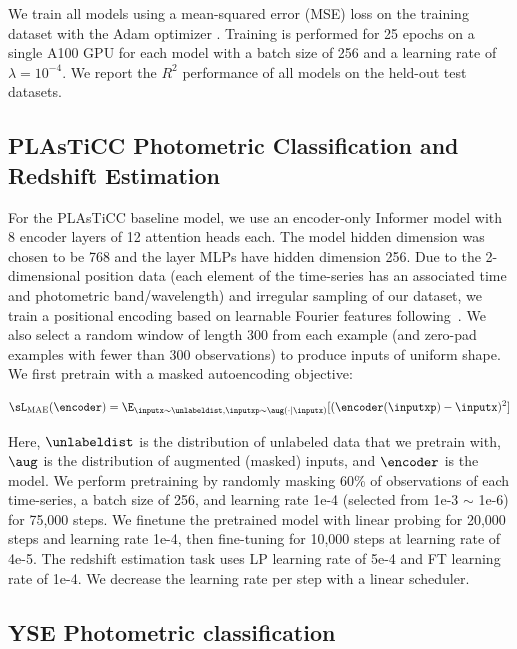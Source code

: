 We train all models using a mean-squared error (MSE) loss on the training dataset with the Adam optimizer \citep{kingma2014adam}. Training is performed for 25 epochs on a single A100 GPU for each model with a batch size of 256 and a learning rate of $\lambda = 10^{-4}$. We report the $R^2$ performance of all models on the held-out test datasets.

\subsection{PLAsTiCC Photometric Classification and Redshift Estimation}
\label{app:plasticc-baselines}
For the PLAsTiCC baseline model, we use an encoder-only Informer model \citep{zhou2021informer} with 8 encoder layers of 12 attention heads each. The model hidden dimension was chosen to be 768 and the layer MLPs have hidden dimension 256. Due to the 2-dimensional position data (each element of the time-series has an associated time and photometric band/wavelength) and irregular sampling of our dataset, we train a positional encoding based on learnable Fourier features following~\citep{li2021learnable}. We also select a random window of length 300 from each example (and zero-pad examples with fewer than 300 observations) to produce inputs of uniform shape. 
We first pretrain with a masked autoencoding objective:

\begin{align}
\label{eqn:mae_objective}
\sL_{\text{MAE}}(\encoder) = \E_{\inputx\sim \unlabeldist,\inputxp\sim\aug(\cdot \mid \inputx)}[(\encoder(\inputxp)-\inputx)^2]
\end{align}

Here, $\unlabeldist$ is the distribution of unlabeled data that we pretrain with, $\aug$ is the distribution of augmented (masked) inputs, and $\encoder$ is the model. We perform pretraining by randomly masking 60\% of observations of each time-series, a batch size of 256, and learning rate 1e-4 (selected from 1e-3 $\sim$ 1e-6) for 75,000 steps. We finetune the pretrained model with linear probing for 20,000 steps and learning rate 1e-4, then fine-tuning for 10,000 steps at learning rate of 4e-5. The redshift estimation task uses LP learning rate of 5e-4 and FT learning rate of 1e-4. We decrease the learning rate per step with a linear scheduler.

\subsection{YSE Photometric classification}

